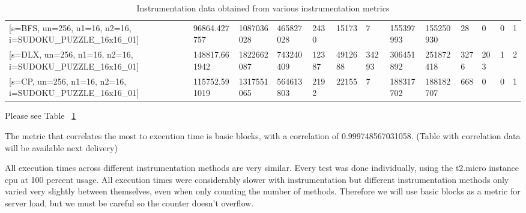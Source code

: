 \documentclass[10pt,twocolumn]{article}
\begin{document}
\begin{table}[p]
{\begin{tabular}{@{}lllllllllllll@{}}
    {\color[HTML]{000000} {[}s=BFS, un=256, n1=16, n2=16, i=SUDOKU\_PUZZLE\_16x16\_01{]}} & {\color[HTML]{000000} 96864.427757}  & {\color[HTML]{000000} 1087036028}   & {\color[HTML]{000000} 465827028}    & {\color[HTML]{000000} 2430}           & {\color[HTML]{000000} 15173}        & {\color[HTML]{000000} 7}           & {\color[HTML]{000000} 155397993}    & {\color[HTML]{000000} 155250930}     & {\color[HTML]{000000} 28}     & {\color[HTML]{000000} 0}        & {\color[HTML]{000000} 0}         & {\color[HTML]{000000} 1}              \\
    {\color[HTML]{000000} {[}s=DLX, un=256, n1=16, n2=16, i=SUDOKU\_PUZZLE\_16x16\_01{]}} & {\color[HTML]{000000} 148817.661942} & {\color[HTML]{000000} 1822662087}   & {\color[HTML]{000000} 743240409}    & {\color[HTML]{000000} 12387}          & {\color[HTML]{000000} 4912688}      & {\color[HTML]{000000} 34293}       & {\color[HTML]{000000} 306451892}    & {\color[HTML]{000000} 251872418}     & {\color[HTML]{000000} 3276}   & {\color[HTML]{000000} 203}      & {\color[HTML]{000000} 1}         & {\color[HTML]{000000} 2}              \\
    {\color[HTML]{000000} {[}s=CP, un=256, n1=16, n2=16, i=SUDOKU\_PUZZLE\_16x16\_01{]}}  & {\color[HTML]{000000} 115752.591019} & {\color[HTML]{000000} 1317551065}   & {\color[HTML]{000000} 564613803}    & {\color[HTML]{000000} 2192}           & {\color[HTML]{000000} 22155}        & {\color[HTML]{000000} 7}           & {\color[HTML]{000000} 188317702}    & {\color[HTML]{000000} 188182707}     & {\color[HTML]{000000} 668}    & {\color[HTML]{000000} 0}        & {\color[HTML]{000000} 0}         & {\color[HTML]{000000} 1}              \\ \bottomrule
    \end{tabular}%
    }
    \caption{Instrumentation data obtained from various instrumentation metrics}
    \label{table:myTable1}
\end{table}


Please see Table ~\ref{table:myTable1}

The metric that correlates the most to execution time is basic blocks, with a correlation of 0.999748567031058. (Table with correlation data will be available next delivery)

All execution times across different instrumentation methods are very similar.
Every test was done individually, using the t2.micro instance cpu at 100 percent usage.
All execution times were considerably slower with instrumentation but different instrumentation methods only varied very slightly between themselves, even when only counting the number of methods.
Therefore we will use basic blocks as a metric for server load, but we must be careful so the counter doesn’t overflow.
\end{document}
